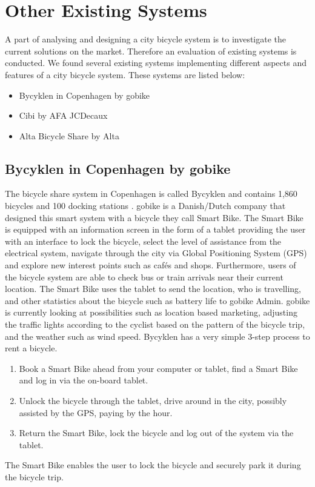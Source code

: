 \section{Other Existing Systems}
A part of analysing and designing a city bicycle system is to investigate the current solutions on the market. 
Therefore an evaluation of existing systems is conducted.
We found several existing systems implementing different aspects and features of a city bicycle system. 
These systems are listed below:
\begin{itemize}
\item Bycyklen in Copenhagen by gobike
\item Cibi by AFA JCDecaux
\item Alta Bicycle Share by Alta
\end{itemize}
\subsection{Bycyklen in Copenhagen by gobike}
The bicycle share system in Copenhagen is called Bycyklen and contains 1,860 bicycles and 100 docking stations \citep{misc:bycyklen}. 
gobike is a Danish/Dutch company that designed this smart system with a bicycle they call Smart Bike. 
The Smart Bike is equipped with an information screen in the form of a tablet providing the user with an interface to lock the bicycle, select the level of assistance from the electrical system, navigate through the city via Global Positioning System (GPS) and explore new interest points such as cafés and shops.
Furthermore, users of the bicycle system are able to check bus or train arrivals near their current location.
The Smart Bike uses the tablet to send the location, who is travelling, and other statistics about the bicycle such as battery life to gobike Admin.
gobike is currently looking at possibilities such as location based marketing, adjusting the traffic lights according to the cyclist based on the pattern of the bicycle trip, and the weather such as wind speed.
Bycyklen has a very simple 3-step process to rent a bicycle.
\begin{enumerate}
\item Book a Smart Bike ahead from your computer or tablet, find a Smart Bike and log in via the on-board tablet.
\item Unlock the bicycle through the tablet, drive around in the city, possibly assisted by the GPS, paying by the hour.
\item Return the Smart Bike, lock the bicycle and log out of the system via the tablet.
\end{enumerate}
The Smart Bike enables the user to lock the bicycle and securely park it during the bicycle trip.

